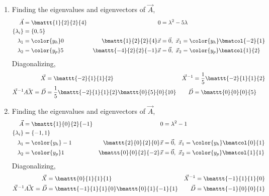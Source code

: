 \begin{enumerate}
    \item Finding the eigenvalues and eigenvectors of $ \vec{A} $,
          \begin{align}
              \vec{A}                       & = \bmattt{1}{2}{2}{4}  &
              0                             & = \lambda^2 - 5\lambda   \\
              \{\lambda_i\}                 & = \{0, 5\}               \\
              \lambda_1                     & = \color{y_h} 0        &
              \bmattt{1}{2}{2}{4} \vec{x}   & = \vec{0},\
              \vec{x}_1 = \color{y_h} \bmatcol{-2}{1}                  \\
              \lambda_2                     & = \color{y_p} 5        &
              \bmattt{-4}{2}{2}{-1} \vec{x} & = \vec{0},\
              \vec{x}_2 = \color{y_p} \bmatcol{1}{2}
          \end{align}
          Diagonalizing,
          \begin{align}
              \vec{X}                        & = \bmattt{-2}{1}{1}{2}             &
              \vec{X}^{-1}                   & = \frac{1}{5} \bmattt{-2}{1}{1}{2}   \\
              \vec{X}^{-1}\vec{AX} = \vec{D} & = \frac{1}{5} \bmattt{-2}{1}{1}{2}
              \bmattt{0}{5}{0}{10}           &
              \vec{D}                        & = \bmattt{0}{0}{0}{5}
          \end{align}

    \item Finding the eigenvalues and eigenvectors of $ \vec{A} $,
          \begin{align}
              \vec{A}                      & = \bmattt{1}{0}{2}{-1} &
              0                            & = \lambda^2 - 1          \\
              \{\lambda_i\}                & = \{-1, 1\}              \\
              \lambda_1                    & = \color{y_h} -1       &
              \bmattt{2}{0}{2}{0} \vec{x}  & = \vec{0},\
              \vec{x}_1 = \color{y_h} \bmatcol{0}{1}                  \\
              \lambda_2                    & = \color{y_p} 1        &
              \bmattt{0}{0}{2}{-2} \vec{x} & = \vec{0},\
              \vec{x}_2 = \color{y_p} \bmatcol{1}{1}
          \end{align}
          Diagonalizing,
          \begin{align}
              \vec{X}                        & = \bmattt{0}{1}{1}{1}  &
              \vec{X}^{-1}                   & = \bmattt{-1}{1}{1}{0}   \\
              \vec{X}^{-1}\vec{AX} = \vec{D} & = \bmattt{-1}{1}{1}{0}
              \bmattt{0}{1}{-1}{1}           &
              \vec{D}                        & = \bmattt{-1}{0}{0}{1}
          \end{align}


\end{enumerate}
